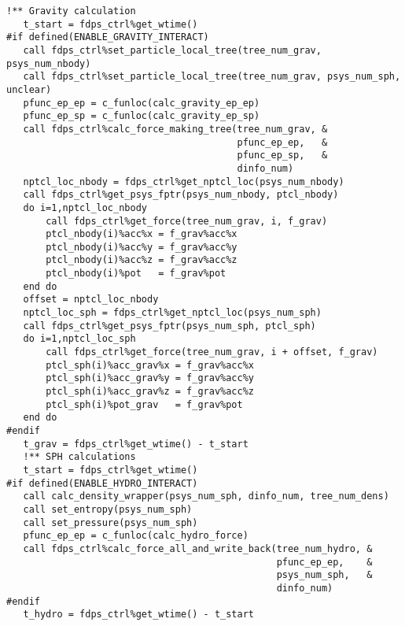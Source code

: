 \begin{lstlisting}[caption=Interaction calculations]
   !** Gravity calculation
   t_start = fdps_ctrl%get_wtime()
#if defined(ENABLE_GRAVITY_INTERACT)
   call fdps_ctrl%set_particle_local_tree(tree_num_grav, psys_num_nbody)
   call fdps_ctrl%set_particle_local_tree(tree_num_grav, psys_num_sph, unclear)
   pfunc_ep_ep = c_funloc(calc_gravity_ep_ep)
   pfunc_ep_sp = c_funloc(calc_gravity_ep_sp)
   call fdps_ctrl%calc_force_making_tree(tree_num_grav, &
                                         pfunc_ep_ep,   &
                                         pfunc_ep_sp,   &
                                         dinfo_num)
   nptcl_loc_nbody = fdps_ctrl%get_nptcl_loc(psys_num_nbody)
   call fdps_ctrl%get_psys_fptr(psys_num_nbody, ptcl_nbody)
   do i=1,nptcl_loc_nbody
       call fdps_ctrl%get_force(tree_num_grav, i, f_grav)
       ptcl_nbody(i)%acc%x = f_grav%acc%x
       ptcl_nbody(i)%acc%y = f_grav%acc%y
       ptcl_nbody(i)%acc%z = f_grav%acc%z
       ptcl_nbody(i)%pot   = f_grav%pot
   end do
   offset = nptcl_loc_nbody
   nptcl_loc_sph = fdps_ctrl%get_nptcl_loc(psys_num_sph)
   call fdps_ctrl%get_psys_fptr(psys_num_sph, ptcl_sph)
   do i=1,nptcl_loc_sph
       call fdps_ctrl%get_force(tree_num_grav, i + offset, f_grav)
       ptcl_sph(i)%acc_grav%x = f_grav%acc%x
       ptcl_sph(i)%acc_grav%y = f_grav%acc%y
       ptcl_sph(i)%acc_grav%z = f_grav%acc%z
       ptcl_sph(i)%pot_grav   = f_grav%pot
   end do
#endif
   t_grav = fdps_ctrl%get_wtime() - t_start
   !** SPH calculations
   t_start = fdps_ctrl%get_wtime()
#if defined(ENABLE_HYDRO_INTERACT)
   call calc_density_wrapper(psys_num_sph, dinfo_num, tree_num_dens)
   call set_entropy(psys_num_sph)
   call set_pressure(psys_num_sph)
   pfunc_ep_ep = c_funloc(calc_hydro_force)
   call fdps_ctrl%calc_force_all_and_write_back(tree_num_hydro, &
                                                pfunc_ep_ep,    &
                                                psys_num_sph,   &
                                                dinfo_num)
#endif
   t_hydro = fdps_ctrl%get_wtime() - t_start
\end{lstlisting}
\endifFtn
\ifC %
